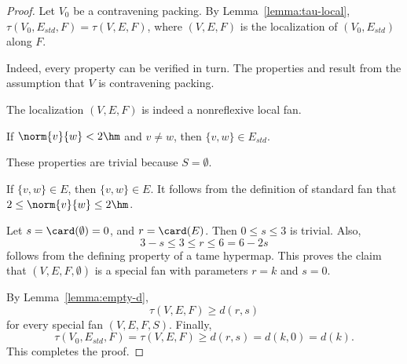 \begin{proof}
  Let $V_0$ be a contravening packing.  By
  Lemma~\ref{lemma:tau-local}, $\tau(V_0,E_{std},F)=\tau(V,E,F)$, where
  $(V,E,F)$ is the localization of $(V_0,E_{std})$ along $F$.

    Indeed,
  every property can be verified in turn.  The properties
   and  result from the assumption that
  $V$ is contravening packing.

  The localization $(V,E,F)$ is indeed a nonreflexive local fan.

 If $\norm{v}{w}<2\hm$ and $v\ne w$, then $\{v,w\}\in
E_{std}$.

  These properties are trivial because
$S=\emptyset$.

 If $\{v,w\}\in E$, then $\{v,w\}\in E$.  It follows from
the definition of standard fan that $2\le \norm{v}{w}\le 2\hm$.

 Let $s=\card(\emptyset) = 0$, and $r=\card(E)$.  Then
$0\le s\le 3$ is trivial. Also,
\[ 3-s \le 3\le r \le 6=6 - 2s\] 
follows from the defining property  of a tame
hypermap.  This proves the claim that $(V,E,F,\emptyset)$ is a special fan with parameters $r=k$ and $s=0$.

By Lemma~\ref{lemma:empty-d}, 
\[ 
\tau(V,E,F) \ge d (r,s)
\] 
for every special fan $(V,E,F,S)$. 
Finally, 
\[ 
\tau(V_0,E_{std},F)=\tau(V,E,F) \ge d(r,s) = d(k,0) = d(k).
\]   
This completes the proof.
\end{proof}


